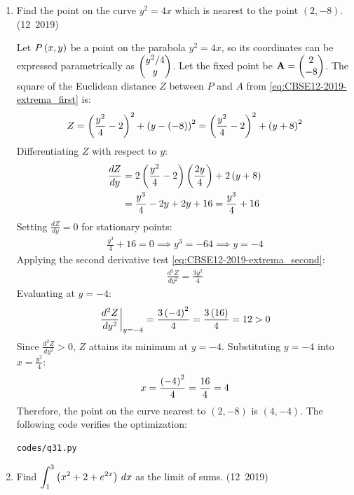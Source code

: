 \begin{enumerate}[label=\thesubsection.\arabic*, ref=\thesubsection.\theenumi]
\item Find the point on the curve $y^2 = 4x$ which is nearest to the point $(2, -8)$.
\hfill (12~2019)

\solution
Let $P\left(x, y\right)$ be a point on the parabola $y^2 = 4x$, so its coordinates can be expressed parametrically as $\begin{pmatrix}y^2/4 \\ y\end{pmatrix}$.
Let the fixed point be $\mathbf{A} = \begin{pmatrix}2 \\ -8\end{pmatrix}$.
The square of the Euclidean distance $Z$ between $P$ and $A$ from \eqref{eq:CBSE12-2019-extrema_first} is:
\begin{align}
	Z = \left(\frac{y^2}{4} - 2\right)^2 + \left(y - \left(-8\right)\right)^2 = \left(\frac{y^2}{4} - 2\right)^2 + \left(y + 8\right)^2
\end{align}
Differentiating $Z$ with respect to $y$:
\begin{align}
	\frac{dZ}{dy} &= 2\left(\frac{y^2}{4} - 2\right)\left(\frac{2y}{4}\right) + 2\left(y + 8\right) \\
	&= \frac{y^3}{4} - 2y + 2y + 16 = \frac{y^3}{4} + 16
\end{align}
Setting $\frac{dZ}{dy} = 0$ for stationary points:
\begin{align}
	\frac{y^3}{4} + 16 = 0 \implies y^3 = -64 \implies y = -4
\end{align}
Applying the second derivative test \eqref{eq:CBSE12-2019-extrema_second}:
\begin{align}
	\frac{d^2Z}{dy^2} = \frac{3y^2}{4}
\end{align}
Evaluating at $y = -4$:
\begin{align}
	\left.\frac{d^2Z}{dy^2}\right|_{y=-4} = \frac{3\left(-4\right)^2}{4} = \frac{3\left(16\right)}{4} = 12 > 0
\end{align}
Since $\frac{d^2Z}{dy^2} > 0$, $Z$ attains its minimum at $y = -4$.
Substituting $y = -4$ into $x = \frac{y^2}{4}$:
\begin{align}
	x = \frac{\left(-4\right)^2}{4} = \frac{16}{4} = 4
\end{align}
Therefore, the point on the curve nearest to $(2, -8)$ is $(4, -4)$.
The following code verifies the optimization:
\begin{lstlisting}[frame=single, basicstyle=\ttfamily\small]
	codes/q31.py
\end{lstlisting}

\item Find $\displaystyle\int_1^3 \left(x^2 + 2 + e^{2x}\right)\,dx$ as the limit of sums.
\hfill (12~2019)


\end{enumerate}
